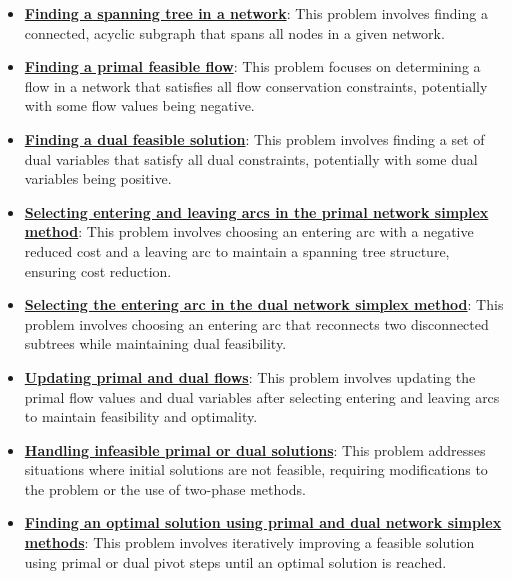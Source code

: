 \documentclass{article}%
\begin{document}
\begin{itemize}[leftmargin=*]%
\item \href{https://www.math.purdue.edu/~yipn/421/2024-11-07-NetSimplex.pdf#page=1}{\textbf{Finding a spanning tree in a network}}: This problem involves finding a connected, acyclic subgraph that spans all nodes in a given network.%
\item \href{https://www.math.purdue.edu/~yipn/421/2024-11-07-NetSimplex.pdf#page=2}{\textbf{Finding a primal feasible flow}}: This problem focuses on determining a flow in a network that satisfies all flow conservation constraints, potentially with some flow values being negative.%
\item \href{https://www.math.purdue.edu/~yipn/421/2024-11-07-NetSimplex.pdf#page=3}{\textbf{Finding a dual feasible solution}}: This problem involves finding a set of dual variables that satisfy all dual constraints, potentially with some dual variables being positive.%
\item \href{https://www.math.purdue.edu/~yipn/421/2024-11-07-NetSimplex.pdf#page=6}{\textbf{Selecting entering and leaving arcs in the primal network simplex method}}: This problem involves choosing an entering arc with a negative reduced cost and a leaving arc to maintain a spanning tree structure, ensuring cost reduction.%
\item \href{https://www.math.purdue.edu/~yipn/421/2024-11-07-NetSimplex.pdf#page=35}{\textbf{Selecting the entering arc in the dual network simplex method}}: This problem involves choosing an entering arc that reconnects two disconnected subtrees while maintaining dual feasibility.%
\item \href{https://www.math.purdue.edu/~yipn/421/2024-11-07-NetSimplex.pdf#page=6}{\textbf{Updating primal and dual flows}}: This problem involves updating the primal flow values and dual variables after selecting entering and leaving arcs to maintain feasibility and optimality.%
\item \href{https://www.math.purdue.edu/~yipn/421/2024-11-07-NetSimplex.pdf#page=2}{\textbf{Handling infeasible primal or dual solutions}}: This problem addresses situations where initial solutions are not feasible, requiring modifications to the problem or the use of two-phase methods.%
\item \href{https://www.math.purdue.edu/~yipn/421/2024-11-07-NetSimplex.pdf#page=5}{\textbf{Finding an optimal solution using primal and dual network simplex methods}}: This problem involves iteratively improving a feasible solution using primal or dual pivot steps until an optimal solution is reached.%

\end{itemize}
\end{document}
